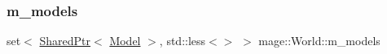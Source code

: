 \hypertarget{classmage_1_1_world_ad2c8da43f7cc24ec9f3108d24ff3c144}{}\label{classmage_1_1_world_ad2c8da43f7cc24ec9f3108d24ff3c144} 
\subsubsection{\texorpdfstring{m\+\_\+models}{m\_models}}
{\footnotesize\ttfamily set$<$ \hyperlink{namespacemage_a1e01ae66713838a7a67d30e44c67703e}{Shared\+Ptr}$<$ \hyperlink{classmage_1_1_model}{Model} $>$, std\+::less$<$$>$ $>$ mage\+::\+World\+::m\+\_\+models\hspace{0.3cm}{\ttfamily [private]}}

